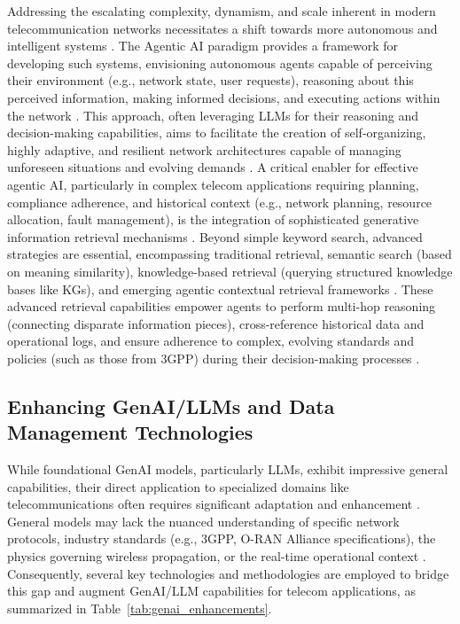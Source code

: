 \documentclass[sigconf]{acmart}
\begin{document}
Addressing the escalating complexity, dynamism, and scale inherent in modern telecommunication networks necessitates a shift towards more autonomous and intelligent systems \cite{ref35}. The Agentic AI paradigm provides a framework for developing such systems, envisioning autonomous agents capable of perceiving their environment (e.g., network state, user requests), reasoning about this perceived information, making informed decisions, and executing actions within the network \cite{ref35}. This approach, often leveraging LLMs for their reasoning and decision-making capabilities, aims to facilitate the creation of self-organizing, highly adaptive, and resilient network architectures capable of managing unforeseen situations and evolving demands \cite{ref35}. A critical enabler for effective agentic AI, particularly in complex telecom applications requiring planning, compliance adherence, and historical context (e.g., network planning, resource allocation, fault management), is the integration of sophisticated generative information retrieval mechanisms \cite{ref35}. Beyond simple keyword search, advanced strategies are essential, encompassing traditional retrieval, semantic search (based on meaning similarity), knowledge-based retrieval (querying structured knowledge bases like KGs), and emerging agentic contextual retrieval frameworks \cite{ref35}. These advanced retrieval capabilities empower agents to perform multi-hop reasoning (connecting disparate information pieces), cross-reference historical data and operational logs, and ensure adherence to complex, evolving standards and policies (such as those from 3GPP) during their decision-making processes \cite{ref35}.

\subsection{Enhancing GenAI/LLMs and Data Management Technologies}

While foundational GenAI models, particularly LLMs, exhibit impressive general capabilities, their direct application to specialized domains like telecommunications often requires significant adaptation and enhancement \cite{ref4, ref17, ref18}. General models may lack the nuanced understanding of specific network protocols, industry standards (e.g., 3GPP, O-RAN Alliance specifications), the physics governing wireless propagation, or the real-time operational context \cite{ref4, ref17}. Consequently, several key technologies and methodologies are employed to bridge this gap and augment GenAI/LLM capabilities for telecom applications, as summarized in Table~\ref{tab:genai_enhancements}.
\end{document}
